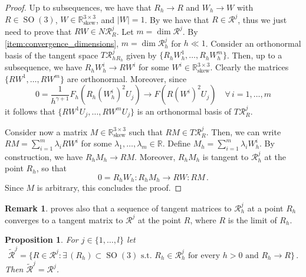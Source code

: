 \documentclass{article}
\theoremstyle{plain}
\theoremstyle{plain}
\theoremstyle{plain}
\theoremstyle{plain}
\theoremstyle{plain}
\newtheorem{prop}[teo]{Proposition}
\theoremstyle{definition}
\newtheorem{remark}[teo]{Remark}
\theoremstyle{definition}
\renewcommand{\r}{\mathbb{R}}
\DeclareMathOperator{\SO}{SO}
\DeclareMathOperator{\skw}{skew}
\begin{document}
\begin{proof}
	Up to subsequences, we have that $R_h \to R$ and $W_h \to W$ with $R \in \SO(3)$, $W \in \r^{3 \times 3}_{\skw}$, and $|W| = 1$. By  we have that $R \in \mathcal{R}^j$, thus we just need to prove that $RW \in N\mathcal{R}^j_R$. Let $m = \dim \mathcal{R}^j$. By \ref{item:convergence_dimensions}, $m = \dim \mathcal{R}^j_h$ for $h \ll 1$. Consider an orthonormal basis of the tangent space $T \mathcal{R}_h^j{}_{R_h}$ given by $\{R_h W_h^1, \dots, R_h W_h^m\}$. Then, up to a subsequence, we have $R_h W_h^i \to R W^i$ for some $W^i \in \r^{3 \times 3}_{\skw}$. Clearly the matrices $\{R W^1, \dots, R W^m\}$ are orthonormal. Moreover, since
	\[
	0 = \dfrac{1}{h^{\gamma+1}}F_h(R_h (W^i_h)^2 U_j) \to F(R (W^i)^2 U_j) \quad \forall \, i =1, \dots, m 
	\]
	it follows that $\{R W^1 U_j, \dots, R W^m U_j\}$ is an orthonormal basis of $T\mathcal{R}^j_R$. 
	
	Consider now a matrix $M \in \r^{3 \times 3}_{\skw}$ such that $RM \in T\mathcal{R}^j_R$. Then, we can write $RM = \sum_{i = 1}^m \lambda_i RW^i$ for some $\lambda_1, \dots, \lambda_m \in \r$. Define $M_h = \sum_{i=1}^m \lambda_i W_h^i$. By construction, we have $R_h M_h \to RM$. Moreover, $R_h M_h$ is tangent to $\mathcal{R}_h^j$ at the point $R_h$, so that
	\[
		0 = R_hW_h : R_h M_h \to RW : RM \,.
	\]
	Since $M$ is arbitrary, this concludes the proof.
\end{proof}

\begin{remark}
	 proves also that a sequence of tangent matrices to $\mathcal{R}_h^j$ at a point $R_h$ converges to a tangent matrix to $\mathcal{R}^j$ at the point $R$, where $R$ is the limit of $R_h$.
\end{remark}

\begin{prop}\label{prop:R_tilde_R}
	For $j \in \{1, \dots, l\}$ let
	\[
		\tilde{\mathcal{R}}^j = \{R \in \mathcal{R}^j \colon \exists \, (R_h) \subset \SO(3) \, \, \text{s.t.} \, \, R_h \in \mathcal{R}_h^j \, \, \text{for every $h > 0$ and} \, \, R_h \to R\} \,.
	\]
	Then $\tilde{\mathcal{R}}^j = \mathcal{R}^j$.
\end{prop}
\end{document}

